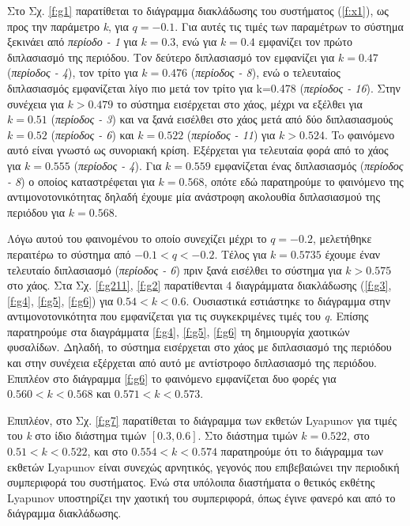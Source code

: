 Στο Σχ. \ref{f:g1} παρατίθεται το διάγραμμα διακλάδωσης του συστήματος (\ref{f:x1}), ως προς την παράμετρο \emph{k}, για $q =- 0.1$. Για αυτές τις τιμές των παραμέτρων το σύστημα ξεκινάει από \emph{περίοδο - 1} για $k=0.3$, ενώ για  $k = 0.4$ εμφανίζει τον πρώτο διπλασιασμό της περιόδου. Τον δεύτερο διπλασιασμό τον εμφανίζει για $k=0.47$ (\emph{περίοδος - 4}), τον τρίτο για $k=0.476$  (\emph{περίοδος -   8}), ενώ ο τελευταίος διπλασιασμός εμφανίζεται λίγο πιο μετά τον τρίτο για k=0.478 (\emph{περίοδος - 16}). Στην συνέχεια για $k>0.479$ το σύστημα εισέρχεται στο χάος, μέχρι να εξέλθει για $k=0.51$ (\emph{περίοδος - 3}) και να ξανά εισέλθει στο χάος μετά από δύο διπλασιασμούς $k=0.52$ (\emph{περίοδος -   6}) και $k=0.522$ (\emph{περίοδος - 11}) για $k>0.524$. To φαινόμενο αυτό είναι γνωστό ως συνοριακή κρίση. Εξέρχεται για τελευταία φορά από το χάος για $k=0.555$ (\emph{περίοδος -   4}). Για $k=0.559$ εμφανίζεται ένας διπλασιασμός (\emph{περίοδος - 8}) ο οποίος καταστρέφεται για $k=0.568$, οπότε εδώ παρατηρούμε το φαινόμενο της αντιμονοτονικότητας δηλαδή έχουμε μία ανάστροφη ακολουθία διπλασιασμού της περιόδου για $k=0.568$. 

Λόγω αυτού του φαινομένου το οποίο συνεχίζει μέχρι το $q=-0.2$, μελετήθηκε περαιτέρω το σύστημα από $-0.1 < q < -0.2$. Τέλος για $k=0.5735$ έχουμε έναν τελευταίο διπλασιασμό (\emph{περίοδος - 6}) πριν ξανά εισέλθει το σύστημα για $k > 0.575$ στο χάος.
Στα Σχ. \ref{f:g211}, \ref{f:g2} παρατίθενται 4 διαγράμματα διακλάδωσης 
(\ref{f:g3}, \ref{f:g4}, \ref{f:g5}, \ref{f:g6})
για $0.54<k<0.6$. Ουσιαστικά εστιάστηκε το διάγραμμα στην αντιμονοτονικότητα που εμφανίζεται για τις συγκεκριμένες τιμές του \emph{q}. Επίσης παρατηρούμε στα διαγράμματα \ref{f:g4}, \ref{f:g5}, \ref{f:g6} τη δημιουργία χαοτικών φυσαλίδων. Δηλαδή, το σύστημα εισέρχεται στο χάος με διπλασιασμό της περιόδου και στην συνέχεια εξέρχεται από αυτό με αντίστροφο διπλασιασμό της περιόδου. Επιπλέον στο διάγραμμα \ref{f:g6} το φαινόμενο εμφανίζεται δυο φορές  για $0.560<k<0.568$ και $0.571<k<0.573$. 

Επιπλέον, στο Σχ. \ref{f:g7} παρατίθεται το διάγραμμα των εκθετών Lyapunov για τιμές του \emph{k} στο ίδιο διάστημα τιμών $[0.3, 0.6]$. Στο διάστημα τιμών   $k=0.522$, στο $0.51<k<0.522$, και στο $0.554<k<0.574$ παρατηρούμε ότι το διάγραμμα των εκθετών Lyapunov είναι συνεχώς αρνητικός, γεγονός που επιβεβαιώνει την περιοδική συμπεριφορά του συστήματος. Ενώ στα υπόλοιπα διαστήματα ο θετικός εκθέτης Lyapunov υποστηρίζει την χαοτική του συμπεριφορά, όπως έγινε φανερό και από το διάγραμμα διακλάδωσης.

